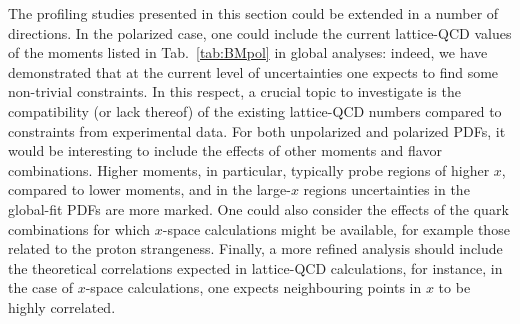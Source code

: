 The profiling studies presented in this section could be extended in
a number of directions.
%
In the polarized case, one could include the current lattice-QCD
values of the moments listed in Tab.~\ref{tab:BMpol} in global analyses: 
indeed, we have demonstrated that at the current level of uncertainties one 
expects to find some non-trivial constraints.
%
In this respect, a crucial topic to investigate is the compatibility 
(or lack thereof) of the existing lattice-QCD numbers compared to constraints 
from experimental data.
%
For both unpolarized and polarized PDFs, it would be interesting to include the 
effects of other moments and flavor combinations.
%
Higher moments, in particular, typically probe regions of higher $x$, compared
to lower moments, and in the large-$x$ regions uncertainties in the global-fit 
PDFs are more marked.
%
One could also consider the effects of the quark combinations for which 
$x$-space calculations might be available, for example those related to the 
proton strangeness.
%
Finally, a more refined analysis should include the theoretical correlations
expected in lattice-QCD calculations, for instance, in the case of $x$-space 
calculations, one expects neighbouring points in $x$ to be highly correlated.

